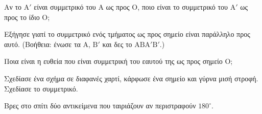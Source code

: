 \ex Αν το $\mathrm{Α}'$ είναι συμμετρικό του $\mathrm{Α}$ ως προς $\mathrm{Ο}$, ποιο είναι το συμμετρικό του $\mathrm{Α}'$ ως προς το ίδιο $\mathrm{Ο}$;

\ex Εξήγησε γιατί το συμμετρικό ενός τμήματος ως προς σημείο είναι παράλληλο προς αυτό. (Βοήθεια: ένωσε τα $\mathrm{Α}$, $\mathrm{Β}'$ και δες το $\mathrm{ΑΒΑ}'\mathrm{Β}'$.)

\ex Ποια είναι η ευθεία που είναι συμμετρική του εαυτού της ως προς σημείο $\mathrm{Ο}$;


\ex Σχεδίασε ένα σχήμα σε διαφανές χαρτί, κάρφωσε ένα σημείο και γύρνα μισή στροφή. Σχεδίασε το συμμετρικό.

\ex Βρες στο σπίτι δύο αντικείμενα που ταιριάζουν αν περιστραφούν $180^\circ$.
